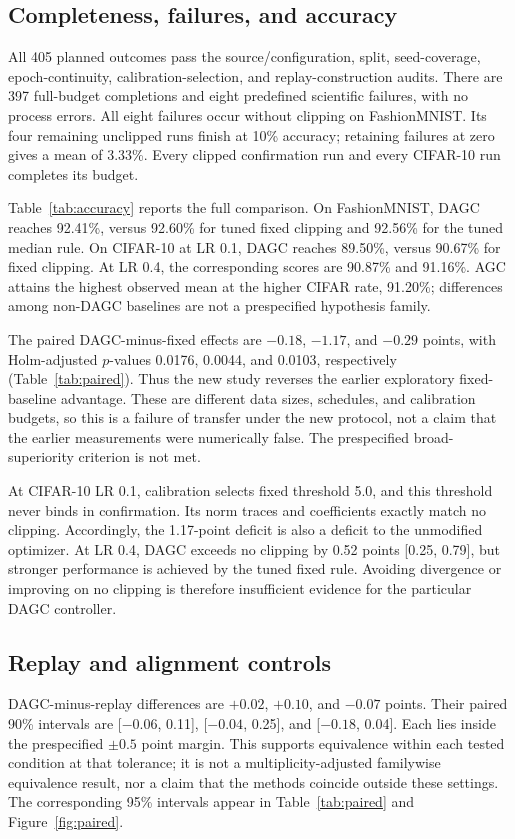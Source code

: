 \subsection{Completeness, failures, and accuracy}
All 405 planned outcomes pass the source/configuration, split, seed-coverage,
epoch-continuity, calibration-selection, and replay-construction audits.
There are 397 full-budget completions and eight predefined scientific
failures, with no process errors. All eight failures occur without clipping
on FashionMNIST. Its four remaining unclipped runs finish at 10\% accuracy;
retaining failures at zero gives a mean of 3.33\%. Every clipped
confirmation run and every CIFAR-10 run completes its budget.

Table~\ref{tab:accuracy} reports the full comparison. On FashionMNIST, DAGC
reaches 92.41\%, versus 92.60\% for tuned fixed clipping and 92.56\% for the
tuned median rule. On CIFAR-10 at LR 0.1, DAGC reaches 89.50\%, versus
90.67\% for fixed clipping. At LR 0.4, the corresponding scores are 90.87\%
and 91.16\%. AGC attains the highest observed mean at the higher CIFAR
rate, 91.20\%; differences among non-DAGC baselines are not a prespecified
hypothesis family.

The paired DAGC-minus-fixed effects are $-0.18$, $-1.17$, and $-0.29$ points,
with Holm-adjusted $p$-values 0.0176, 0.0044, and 0.0103, respectively
(Table~\ref{tab:paired}). Thus the new study reverses the earlier exploratory
fixed-baseline advantage. These are different data sizes, schedules, and
calibration budgets, so this is a failure of transfer under the new protocol,
not a claim that the earlier measurements were numerically false. The
prespecified broad-superiority criterion is not met.

At CIFAR-10 LR 0.1, calibration selects fixed threshold 5.0, and this threshold
never binds in confirmation. Its norm traces and coefficients exactly match
no clipping. Accordingly, the 1.17-point deficit is also a deficit to the
unmodified optimizer. At LR 0.4, DAGC exceeds no clipping by 0.52 points
[0.25, 0.79], but stronger performance is achieved by the tuned fixed rule.
Avoiding divergence or improving on no clipping is therefore insufficient
evidence for the particular DAGC controller.

\subsection{Replay and alignment controls}
DAGC-minus-replay differences are $+0.02$, $+0.10$, and $-0.07$ points.
Their paired 90\% intervals are [$-0.06$, 0.11], [$-0.04$, 0.25], and
[$-0.18$, 0.04]. Each lies inside the prespecified $\pm0.5$ point margin.
This supports equivalence within each tested condition at that tolerance;
it is not a multiplicity-adjusted familywise equivalence result, nor a claim
that the methods coincide outside these settings. The corresponding 95\%
intervals appear in Table~\ref{tab:paired} and Figure~\ref{fig:paired}.

